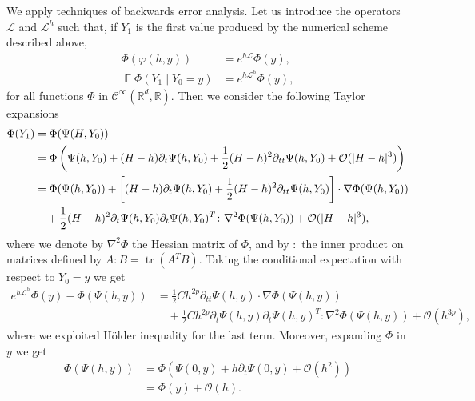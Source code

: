 \documentclass{siamart1116}
\numberwithin{theorem}{section}
\DeclarePairedDelimiter{\abs}{\lvert}{\rvert}
\renewcommand{\phi}{\varphi}
\newcommand{\R}{\mathbb{R}}
\newcommand{\OO}{\mathcal{O}}
\newcommand{\diffL}{\mathcal{L}}
\newcommand{\E}{\operatorname{\mathbb{E}}}
\newcommand{\trace}{\operatorname{tr}}
\begin{document}
We apply techniques of backwards error analysis. Let us introduce the operators $\diffL$ and $\diffL^h$ such that, if $Y_1$ is the first value produced by the numerical scheme described above, 
\begin{equation}
\begin{aligned}
	\Phi(\phi(h, y)) &= e^{h\diffL}\Phi(y),\\
	\E \Phi(Y_1\mid Y_0 = y) &= e^{h\diffL^h}\Phi(y),
\end{aligned}
\end{equation}
for all functions $\Phi$ in $\mathcal{C}^{\infty}(\R^d, \R)$. Then we consider the following Taylor expansions
\begin{equation}
\begin{aligned}
	\Phi(Y_1) &= \Phi(\Psi(H, Y_0)) \\
	&= \Phi\left(\Psi(h, Y_0) + (H-h)\partial_t\Psi (h, Y_0) + \frac{1}{2}(H-h)^2\partial_{tt}\Psi(h,Y_0) + \OO(\abs{H - h}^3)\right)\\
	&= \Phi(\Psi(h, Y_0)) + \left[(H - h)\partial_t\Psi(h, Y_0)+\frac{1}{2}(H-h)^2\partial_{tt}\Psi(h,Y_0)\right] \cdot \nabla\Phi(\Psi(h, Y_0))\\
	&\quad + \frac{1}{2}(H - h)^2 \partial_t{\Psi} (h, Y_0) \partial_t{\Psi} (h, Y_0)^T \colon \nabla^2\Phi(\Psi(h, Y_0)) + \OO(\abs{H - h}^3),
\end{aligned}
\end{equation}
where we denote by $\nabla^2\Phi$ the Hessian matrix of $\Phi$, and by $\colon$ the inner product on matrices defined by $A\colon B = \trace(A^TB)$. Taking the conditional expectation with respect to $Y_0 = y$ we get
\begin{equation}
\begin{aligned}
	e^{h\diffL^h}\Phi(y) - \Phi(\Psi(h, y)) &= \frac{1}{2} Ch^{2p}\partial_{tt}\Psi(h,y)\cdot \nabla\Phi(\Psi(h,y))\\
	&\quad + \frac{1}{2} Ch^{2p}\partial_t{\Psi} (h, y) \partial_t{\Psi} (h, y)^T \colon \nabla^2\Phi(\Psi(h, y)) + \OO(h^{3p}),
\end{aligned}
\end{equation}
where we exploited Hölder inequality for the last term. Moreover, expanding $\Phi$ in $y$ we get
\begin{equation}
\begin{aligned}
	\Phi(\Psi(h, y)) &= \Phi\left(\Psi(0, y) + h\partial_t{\Psi} (0, y) + \OO(h^2)\right) \\
	&= \Phi(y) + \OO(h).
\end{aligned}
\end{equation}
\end{document}
